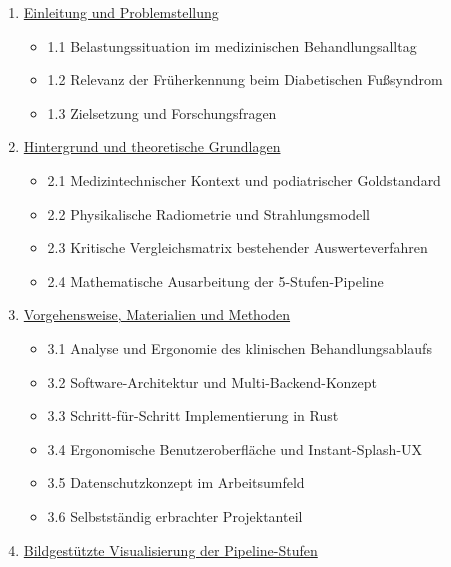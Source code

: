 \documentclass[
  11pt,
]{article}
\providecommand{\tightlist}{%
  \setlength{\itemsep}{0pt}\setlength{\parskip}{0pt}}
\begin{document}
\begin{enumerate}
\def\labelenumi{\arabic{enumi}.}
\tightlist
\item
  \hyperref[1-einleitung-und-problemstellung]{Einleitung und
  Problemstellung}

  \begin{itemize}
  \tightlist
  \item
    1.1 Belastungssituation im medizinischen Behandlungsalltag
  \item
    1.2 Relevanz der Früherkennung beim Diabetischen Fußsyndrom
  \item
    1.3 Zielsetzung und Forschungsfragen
  \end{itemize}
\item
  \hyperref[2-hintergrund-und-theoretische-grundlagen]{Hintergrund und
  theoretische Grundlagen}

  \begin{itemize}
  \tightlist
  \item
    2.1 Medizintechnischer Kontext und podiatrischer Goldstandard
  \item
    2.2 Physikalische Radiometrie und Strahlungsmodell
  \item
    2.3 Kritische Vergleichsmatrix bestehender Auswerteverfahren
  \item
    2.4 Mathematische Ausarbeitung der 5-Stufen-Pipeline
  \end{itemize}
\item
  \hyperref[3-vorgehensweise-materialien-und-methoden]{Vorgehensweise,
  Materialien und Methoden}

  \begin{itemize}
  \tightlist
  \item
    3.1 Analyse und Ergonomie des klinischen Behandlungsablaufs
  \item
    3.2 Software-Architektur und Multi-Backend-Konzept
  \item
    3.3 Schritt-für-Schritt Implementierung in Rust
  \item
    3.4 Ergonomische Benutzeroberfläche und Instant-Splash-UX
  \item
    3.5 Datenschutzkonzept im Arbeitsumfeld
  \item
    3.6 Selbstständig erbrachter Projektanteil
  \end{itemize}
\item
  \hyperref[4-bildgestuxfctzte-visualisierung-der-pipeline-stufen]{Bildgestützte
  Visualisierung der Pipeline-Stufen}


\end{enumerate}
\end{document}
